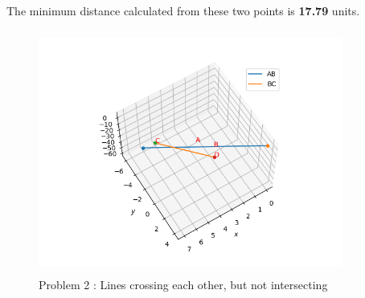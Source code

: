 \documentclass[journal,12pt,twocolumn]{IEEEtran}
\begin{document}
The minimum distance calculated from these two points is \textbf{17.79} units.
\newpage
\begin{figure}[h!]
\centering
\includegraphics[width=10cm, height=8cm]{Figure_2}
\caption{Problem 2 : Lines crossing each other, but not intersecting}
\label{Fig4}
\end{figure}
\end{document}
